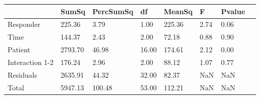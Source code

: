 \begin{tabular}{llllllll}
 & SumSq & PercSumSq & df & MeanSq & F & Pvalue \\ 
 \hline 
Responder & 225.36 & 3.79 & 1.00 & 225.36 & 2.74 & 0.06 \\ 
Time & 144.37 & 2.43 & 2.00 & 72.18 & 0.88 & 0.90 \\ 
Patient & 2793.70 & 46.98 & 16.00 & 174.61 & 2.12 & 0.00 \\ 
Interaction 1-2 & 176.24 & 2.96 & 2.00 & 88.12 & 1.07 & 0.77 \\ 
Residuals & 2635.91 & 44.32 & 32.00 & 82.37 & NaN & NaN \\ 
Total & 5947.13 & 100.48 & 53.00 & 112.21 & NaN & NaN \\ 
\end{tabular} 
